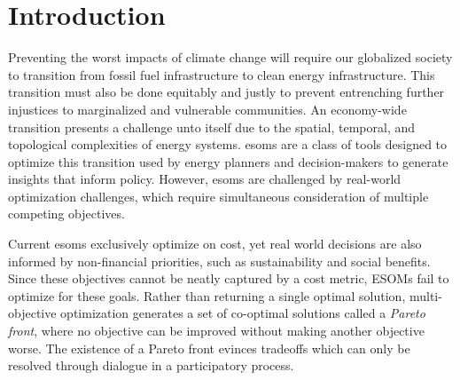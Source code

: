\section{Introduction}





Preventing the worst impacts of climate change will require our globalized society to transition from
fossil fuel infrastructure to clean energy infrastructure. This transition must
also be done equitably and justly to prevent entrenching further injustices to
marginalized and vulnerable communities. An economy-wide transition presents a
challenge unto itself due to the spatial, temporal, and topological complexities
of energy systems. \glspl{esom} are a class of
tools designed to optimize this transition used by energy planners and
decision-makers to generate insights that inform policy. However, \glspl{esom} 
are challenged by real-world 
optimization challenges, which require simultaneous consideration of multiple 
competing objectives.

Current \glspl{esom} exclusively optimize on cost, yet real world decisions are 
also informed by non-financial priorities, such as sustainability and social 
benefits. Since these objectives cannot be neatly captured by a cost metric, 
ESOMs fail to optimize for these goals.  Rather than returning a single optimal 
solution, multi-objective optimization generates a set of co-optimal solutions 
called a \textit{Pareto front}, where no objective can be improved without 
making another objective worse. The existence of a Pareto front evinces 
tradeoffs which can only be resolved through dialogue in a participatory 
process. 

